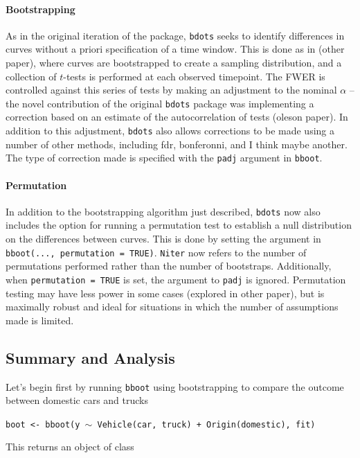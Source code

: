 \documentclass{article}
\newcommand{\xt}{\texttt}%
\begin{document}
\paragraph{Bootstrapping} As in the original iteration of the package, \xt{bdots} seeks to identify differences in curves without a priori specification of a time window. This is done as in (other paper), where curves are bootstrapped to create a sampling distribution, and a collection of $t$-tests is performed at  each observed timepoint. The FWER is controlled against this series of tests by making an adjustment to the nominal $\alpha$ -- the novel contribution of the original \xt{bdots} package was implementing a correction based on an estimate of the autocorrelation of tests (oleson paper). In addition to this adjustment, \xt{bdots} also allows corrections to be made using a number of other methods, including fdr, bonferonni, and I think maybe another. The type of correction made is specified with the \xt{padj} argument in \xt{bboot}.

\paragraph{Permutation} In addition to the bootstrapping algorithm just described, 
\xt{bdots} now also includes the option for running a permutation test to establish a null distribution on the differences between curves. This is done by setting the argument in \xt{bboot(..., permutation = TRUE)}.  \xt{Niter} now refers to the number of permutations performed rather than the number of bootstraps. Additionally, when \xt{permutation = TRUE} is set, the argument to \xt{padj} is ignored. Permutation testing may have less power in some cases (explored in other paper), but is maximally robust and ideal for situations in which the number of assumptions made is limited.

\subsection{Summary and Analysis}

Let's begin first by running \xt{bboot} using bootstrapping to compare the outcome between  domestic cars and trucks

\begin{center}
\tt boot <- bboot(y $\sim$ Vehicle(car, truck) + Origin(domestic), fit)
\end{center}

This returns an object of class 
\end{document}
